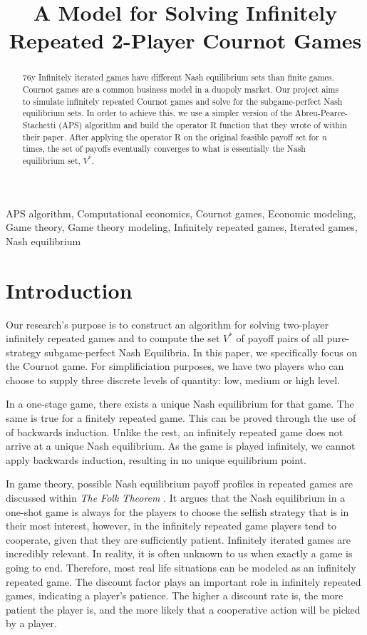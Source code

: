 \documentclass{article}
\title{A Model for Solving Infinitely Repeated 2-Player Cournot Games}
\begin{document}
%
\maketitle
%
\begin{abstract}76y
Infinitely iterated games have different Nash equilibrium sets than finite games. Cournot games are a common business model in a duopoly market. Our project aims to simulate infinitely repeated Cournot games and solve for the subgame-perfect Nash equilibrium sets. In order to achieve this, we use a simpler version of the Abreu-Pearce-Stachetti (APS) algorithm and build the operator R function that they wrote of within their paper. After applying the operator R on the original feasible payoff set for \textit{n} times, the set of payoffs eventually converges to what is essentially the Nash equilibrium set, $V^*$. 
\end{abstract}
%
\begin{keywords}
APS algorithm, Computational economics, Cournot games,  Economic modeling, Game theory, Game theory modeling, Infinitely repeated games, Iterated games,  Nash equilibrium
\end{keywords}
%
\section{Introduction}
\label{sec:intro}

Our research's purpose is to construct an algorithm for solving two-player infinitely repeated games and to compute the set $V^*$ of payoff pairs of all pure-strategy subgame-perfect Nash Equilibria. In this paper, we specifically focus on the Cournot game. For simplificiation purposes, we have two players who can choose to supply three discrete levels of quantity: low, medium or high level. 
	
	In a one-stage game, there exists a unique Nash equilibrium for that game. The same is true for a finitely repeated game. This can be proved through the use of of backwards induction. Unlike the rest, an infinitely repeated game does not arrive at a unique Nash equilibrium. As the game is played infinitely, we cannot apply backwards induction, resulting in no unique equilibrium point. 
	
	In game theory, possible Nash equilibrium payoff profiles in repeated games are discussed within \textit{The Folk Theorem} . It argues that the Nash equilibrium in a one-shot game is always for the players to choose the selfish strategy that is in their most interest, however, in the infinitely repeated game players tend to cooperate, given that they are sufficiently patient. Infinitely iterated games are incredibly relevant. In reality, it is often unknown to us when exactly a game is going to end. Therefore, most real life situations can be modeled as an infinitely repeated game. The discount factor plays an important role in infinitely repeated games, indicating a player's patience. The higher a discount rate is, the more patient the player is, and the more likely that a cooperative action will be picked by a player.
	
\end{document}
